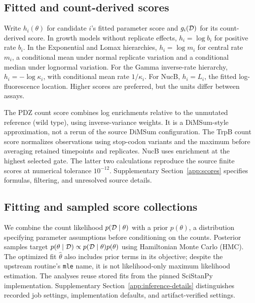 \subsection{Fitted and count-derived scores}

Write $h_i(\theta)$ for candidate $i$'s fitted parameter score and
$g_i(\mathcal{D})$ for its count-derived score. In growth models without
replicate effects, $h_i=\log b_i$ for positive rate $b_i$. In the
Exponential and Lomax hierarchies, $h_i=\log m_i$ for central rate
$m_i$, a conditional mean under normal replicate variation and
a conditional median under lognormal variation. For the Gamma
inverse-rate hierarchy, $h_i=-\log\kappa_i$, with conditional mean
rate $1/\kappa_i$. For NucB, $h_i=L_i$, the fitted log-fluorescence
location. Higher scores are preferred, but the units differ
between assays.

The PDZ count score combines log enrichments relative to the unmutated
reference (wild type), using inverse-variance weights. It is a DiMSum-style approximation,
not a rerun of the source DiMSum configuration. The TrpB count
score normalizes observations using stop-codon variants and the
maximum before averaging retained timepoints and replicates.
NucB uses enrichment at the highest selected gate. The latter
two calculations reproduce the source finite scores at numerical
tolerance $10^{-12}$. Supplementary Section~\ref{app:scores}
specifies formulas, filtering, and unresolved source details.

\subsection{Fitting and sampled score collections}

We combine the count likelihood $p(\mathcal{D}\mid\theta)$ with a prior
$p(\theta)$, a distribution specifying parameter assumptions before
conditioning on the counts. Posterior samples target
$p(\theta\mid\mathcal{D})\propto p(\mathcal{D}\mid\theta)p(\theta)$ using
Hamiltonian Monte Carlo (HMC). The optimized fit $\hat\theta$
also includes prior terms in its objective; despite the upstream
routine's \texttt{mle} name, it is not likelihood-only maximum
likelihood estimation. The analyses reuse stored fits from the
pinned SciStanPy implementation. Supplementary
Section~\ref{app:inference-details} distinguishes recorded job
settings, implementation defaults, and artifact-verified settings.

